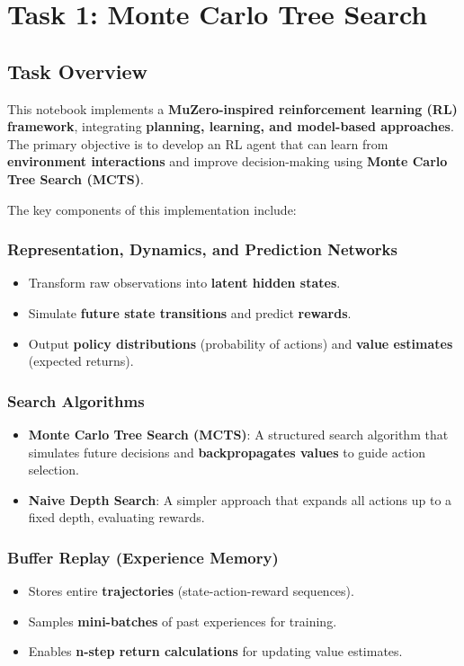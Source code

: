 \section{Task 1: Monte Carlo Tree Search}

\subsection{Task Overview}
This notebook implements a \textbf{MuZero-inspired reinforcement learning (RL) framework}, integrating \textbf{planning, learning, and model-based approaches}. The primary objective is to develop an RL agent that can learn from \textbf{environment interactions} and improve decision-making using \textbf{Monte Carlo Tree Search (MCTS)}.

The key components of this implementation include:

\subsubsection{Representation, Dynamics, and Prediction Networks}
\begin{itemize}
    \item Transform raw observations into \textbf{latent hidden states}.
    \item Simulate \textbf{future state transitions} and predict \textbf{rewards}.
    \item Output \textbf{policy distributions} (probability of actions) and \textbf{value estimates} (expected returns).
\end{itemize}

\subsubsection{Search Algorithms}
\begin{itemize}
    \item \textbf{Monte Carlo Tree Search (MCTS)}: A structured search algorithm that simulates future decisions and \textbf{backpropagates values} to guide action selection.
    \item \textbf{Naive Depth Search}: A simpler approach that expands all actions up to a fixed depth, evaluating rewards.
\end{itemize}

\subsubsection{Buffer Replay (Experience Memory)}
\begin{itemize}
    \item Stores entire \textbf{trajectories} (state-action-reward sequences).
    \item Samples \textbf{mini-batches} of past experiences for training.
    \item Enables \textbf{n-step return calculations} for updating value estimates.
\end{itemize}

